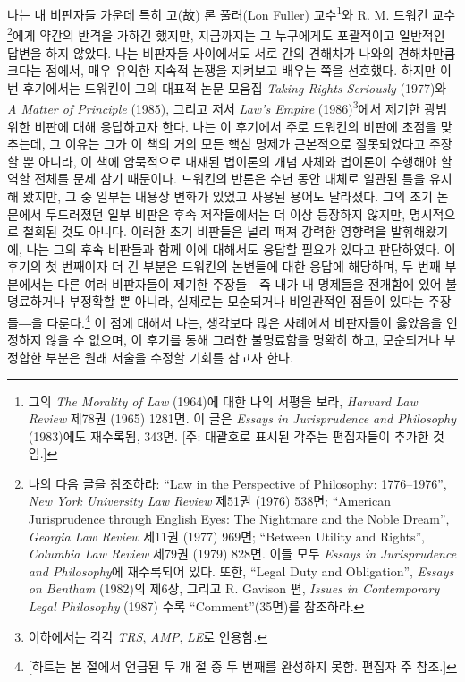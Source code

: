 나는 내 비판자들 가운데 특히 고(故) 론 풀러(Lon Fuller)
교수\footnote{그의 \emph{The Morality of Law} (1964)에 대한 나의 서평을
  보라, \emph{Harvard Law Review} 제78권 (1965) 1281면. 이 글은
  \emph{Essays in Jurisprudence and Philosophy} (1983)에도 재수록됨,
  343면. {[}주: 대괄호로 표시된 각주는 편집자들이 추가한 것임.{]}}와 R.
M. 드워킨 교수\footnote{나의 다음 글을 참조하라: ``Law in the
  Perspective of Philosophy: 1776--1976'', \emph{New York University Law
  Review} 제51권 (1976) 538면; ``American Jurisprudence through English
  Eyes: The Nightmare and the Noble Dream'', \emph{Georgia Law Review}
  제11권 (1977) 969면; ``Between Utility and Rights'', \emph{Columbia
  Law Review} 제79권 (1979) 828면. 이들 모두 \emph{Essays in
  Jurisprudence and Philosophy}에 재수록되어 있다. 또한, ``Legal Duty
  and Obligation'', \emph{Essays on Bentham} (1982)의 제6장, 그리고 R.
  Gavison 편, \emph{Issues in Contemporary Legal Philosophy} (1987) 수록
  ``Comment''(35면)를 참조하라.}에게 약간의 반격을 가하긴 했지만,
지금까지는 그 누구에게도 포괄적이고 일반적인 답변을 하지 않았다. 나는
비판자들 사이에서도 서로 간의 견해차가 나와의 견해차만큼 크다는 점에서,
매우 유익한 지속적 논쟁을 지켜보고 배우는 쪽을 선호했다. 하지만 이번
후기에서는 드워킨이 그의 대표적 논문 모음집 \emph{Taking Rights
Seriously} (1977)와 \emph{A Matter of Principle} (1985), 그리고 저서
\emph{Law's Empire} (1986)\footnote{이하에서는 각각 \emph{TRS},
  \emph{AMP}, \emph{LE}로 인용함.}에서 제기한 광범위한 비판에 대해
응답하고자 한다. 나는 이 후기에서 주로 드워킨의 비판에 초점을 맞추는데,
그 이유는 그가 이 책의 거의 모든 핵심 명제가 근본적으로 잘못되었다고
주장할 뿐 아니라, 이 책에 암묵적으로 내재된 법이론의 개념 자체와
법이론이 수행해야 할 역할 전체를 문제 삼기 때문이다. 드워킨의 반론은
수년 동안 대체로 일관된 틀을 유지해 왔지만, 그 중 일부는 내용상 변화가
있었고 사용된 용어도 달라졌다. 그의 초기 논문에서 두드러졌던 일부 비판은
후속 저작들에서는 더 이상 등장하지 않지만, 명시적으로 철회된 것도
아니다. 이러한 초기 비판들은 널리 퍼져 강력한 영향력을 발휘해왔기에,
나는 그의 후속 비판들과 함께 이에 대해서도 응답할 필요가 있다고
판단하였다. 이 후기의 첫 번째이자 더 긴 부분은 드워킨의 논변들에 대한
응답에 해당하며, 두 번째 부분에서는 다른 여러 비판자들이 제기한
주장들―즉 내가 내 명제들을 전개함에 있어 불명료하거나 부정확할 뿐
아니라, 실제로는 모순되거나 비일관적인 점들이 있다는 주장들―을
다룬다.\footnote{{[}하트는 본 절에서 언급된 두 개 절 중 두 번째를
  완성하지 못함. 편집자 주 참조.{]}} 이 점에 대해서 나는, 생각보다 많은
사례에서 비판자들이 옳았음을 인정하지 않을 수 없으며, 이 후기를 통해
그러한 불명료함을 명확히 하고, 모순되거나 부정합한 부분은 원래 서술을
수정할 기회를 삼고자 한다.

